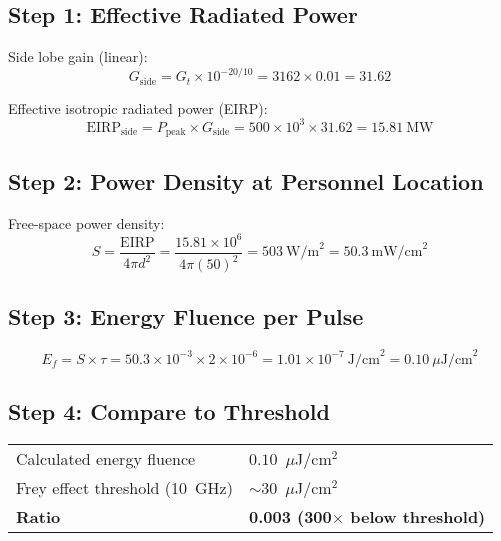 \subsection*{Step 1: Effective Radiated Power}

Side lobe gain (linear):
\begin{equation}
G_{\text{side}} = G_t \times 10^{-20/10} = 3162 \times 0.01 = 31.62
\end{equation}

Effective isotropic radiated power (EIRP):
\begin{equation}
\text{EIRP}_{\text{side}} = P_{\text{peak}} \times G_{\text{side}} = 500 \times 10^3 \times 31.62 = 15.81~\text{MW}
\end{equation}

\subsection*{Step 2: Power Density at Personnel Location}

Free-space power density:
\begin{equation}
S = \frac{\text{EIRP}}{4\pi d^2} = \frac{15.81 \times 10^6}{4\pi (50)^2} = 503~\text{W/m}^2 = 50.3~\text{mW/cm}^2
\end{equation}

\subsection*{Step 3: Energy Fluence per Pulse}

\begin{equation}
E_f = S \times \tau = 50.3 \times 10^{-3} \times 2 \times 10^{-6} = 1.01 \times 10^{-7}~\text{J/cm}^2 = 0.10~\mu\text{J/cm}^2
\end{equation}

\subsection*{Step 4: Compare to Threshold}

\begin{center}
\begin{tabular}{@{}ll@{}}
Calculated energy fluence & $0.10$~$\mu$J/cm$^2$ \\
Frey effect threshold (10~GHz) & $\sim$30~$\mu$J/cm$^2$ \\
\textbf{Ratio} & \textbf{0.003 (300$\times$ below threshold)} \\
\end{tabular}
\end{center}


